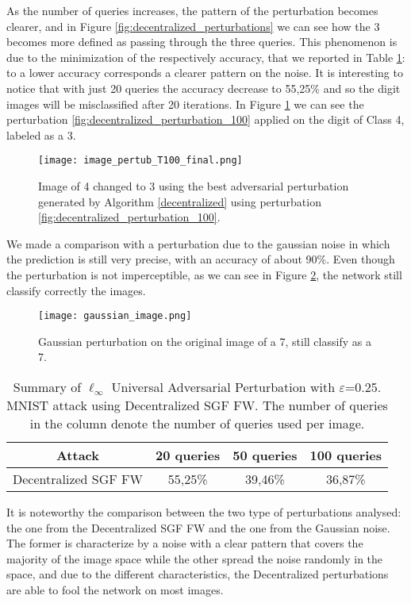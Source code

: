 As the number of queries increases, the pattern of the perturbation becomes clearer, and in Figure \ref{fig:decentralized_perturbations} we can see how the 3 becomes more defined as passing through the three queries. This phenomenon is due to the minimization of the respectively accuracy, that we reported in Table \ref{tab:decentralized}: to a lower accuracy corresponds a clearer pattern on the noise. It is interesting to notice that with just 20 queries the accuracy decrease to 55,25\% and so the digit images will be misclassified after 20 iterations. In Figure \ref{fig:decentralized} we can see the perturbation \ref{fig:decentralized_perturbation_100} applied on the digit of Class 4, labeled as a 3.

\begin{figure}[htbp]
	\centering
	\texttt{[image: image\_pertub\_T100\_final.png]}
	\caption{{\small Image of 4 changed to 3 using the best adversarial perturbation generated by Algorithm \ref{decentralized} using perturbation \ref{fig:decentralized_perturbation_100}.}}
	\label{fig:decentralized}
\end{figure}

We made a comparison with a perturbation due to the gaussian noise in which the prediction is still very precise, with an accuracy of about 90\%. Even though the perturbation is not imperceptible, as we can see in Figure \ref{fig:gaussian_noise}, the network still classify correctly the images.

\begin{figure}[htbp]
	\centering
	\texttt{[image: gaussian\_image.png]}
	\caption{{\small Gaussian perturbation on the original image of a 7, still classify as a 7.}}
	\label{fig:gaussian_noise}
\end{figure}

\begin{table}[htbp]
	\begin{center}
		\begin{adjustwidth}{-.6cm}{}
			\begin{tabular}{c|ccc}
				\textbf{Attack} &          20 \textbf{queries} &      50 \textbf{queries} &     100 \textbf{queries} \\
				\midrule
				{\small Decentralized SGF FW}     &    55,25\% &    39,46\% &       36,87\% \\
			\end{tabular}
		\end{adjustwidth}
	\end{center}
	\caption{{\small Summary of $\ell_\infty$ Universal Adversarial Perturbation with $\varepsilon$=0.25. MNIST attack using Decentralized SGF FW. The number of queries in the column denote the number of queries used per image.}}
	\label{tab:decentralized}
\end{table}

It is noteworthy the comparison between the two type of perturbations analysed: the one from the Decentralized SGF FW and the one from the Gaussian noise. The former is characterize by a noise with a clear pattern that covers the majority of the image space while the other spread the noise randomly in the space, and due to the different characteristics, the Decentralized perturbations are able to fool the network on most images.